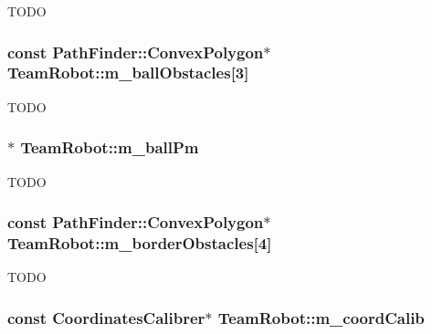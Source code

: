 \label{classTeamRobot_aba2294985cc9a1dc404271e29166da82}
TODO \hypertarget{classTeamRobot_a06fd18a201a66f021e0c72dfd845e26b}{
\subsubsection[{m\_\-ballObstacles}]{\setlength{\rightskip}{0pt plus 5cm}const {\bf PathFinder::ConvexPolygon}$\ast$ {\bf TeamRobot::m\_\-ballObstacles}\mbox{[}3\mbox{]}}}
\label{classTeamRobot_a06fd18a201a66f021e0c72dfd845e26b}
TODO \hypertarget{classTeamRobot_a84b5181a2fadaf7653d32f04fa04d657}{
\subsubsection[{m\_\-ballPm}]{$\ast$ {\bf TeamRobot::m\_\-ballPm}}}
\label{classTeamRobot_a84b5181a2fadaf7653d32f04fa04d657}
TODO \hypertarget{classTeamRobot_a0292337f910ac2bbb300affb87891ba7}{
\subsubsection[{m\_\-borderObstacles}]{\setlength{\rightskip}{0pt plus 5cm}const {\bf PathFinder::ConvexPolygon}$\ast$ {\bf TeamRobot::m\_\-borderObstacles}\mbox{[}4\mbox{]}}}
\label{classTeamRobot_a0292337f910ac2bbb300affb87891ba7}
TODO \hypertarget{classTeamRobot_a3bfcb3cdeedcc11eaed1b5bce532560f}{
\subsubsection[{m\_\-coordCalib}]{\setlength{\rightskip}{0pt plus 5cm}const {\bf CoordinatesCalibrer}$\ast$ {\bf TeamRobot::m\_\-coordCalib}}}

